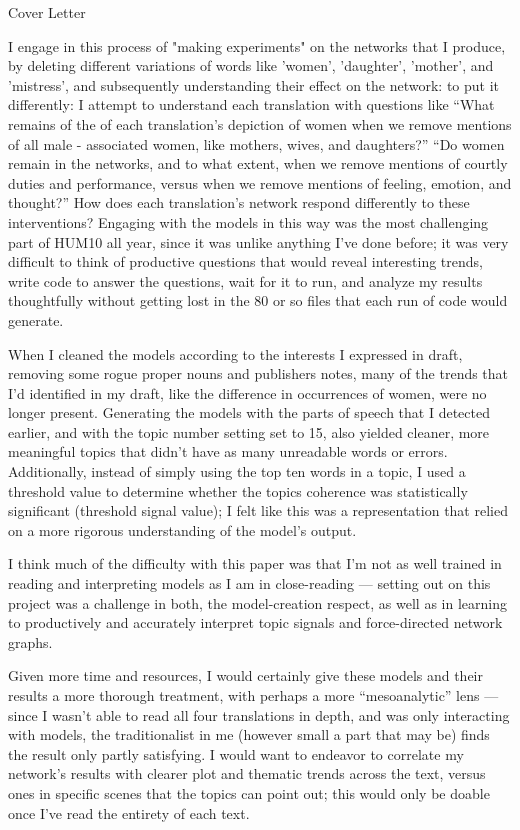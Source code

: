 \documentclass[12pt]{article}
\newenvironment{coverletter}{\begin{center} Cover Letter \end{center}}{\newpage }
\begin{document}
\begin{flushleft}
\begin{spacing}{2.0}
\begin{coverletter}
I engage in this process of "making experiments" on the networks that I produce, by deleting different variations of words like 'women', 'daughter', 'mother', and 'mistress', and subsequently understanding their effect on the network: to put it differently: I attempt to understand each translation with questions like ``What remains of the of each translation's depiction of women when we remove mentions of all male - associated women, like mothers, wives, and daughters?'' ``Do women remain in the networks, and to what extent, when we remove mentions of courtly duties and performance, versus when we remove mentions of feeling, emotion, and thought?'' How does each translation's network respond differently to these interventions? Engaging with the models in this way was the most challenging part of HUM10 all year, since it was unlike anything I've done before; it was very difficult to think of productive questions that would reveal interesting trends, write code to answer the questions, wait for it to run, and analyze my results thoughtfully without getting lost in the 80 or so files that each run of code would generate. \linebreak

When I cleaned the models according to the interests I expressed in draft, removing some rogue proper nouns and publishers notes, many of the trends that I'd identified in my draft, like the difference in occurrences of women, were no longer present. Generating the models with the parts of speech that I detected earlier, and with the topic number setting set to 15, also yielded cleaner, more meaningful topics that didn't have as many unreadable words or errors. Additionally, instead of simply using the top ten words in a topic, I used a threshold value to determine whether the topics coherence was statistically significant (threshold signal value); I felt like this was a representation that relied on a more rigorous understanding of the model's output.\linebreak

I think much of the difficulty with this paper was that I'm not as well trained in reading and interpreting models as I am in close-reading --- setting out on this project was a challenge in both, the model-creation respect, as well as in learning to productively and accurately interpret topic signals and force-directed network graphs. \linebreak

Given more time and resources, I would certainly give these models and their results a more thorough treatment, with perhaps a more ``mesoanalytic'' lens --- since I wasn't able to read all four translations in depth, and was only interacting with models, the traditionalist in me (however small a part that may be) finds the result only partly satisfying. I would want to endeavor to correlate my network's results with clearer plot and thematic trends across the text, versus ones in specific scenes that the topics can point out; this would only be doable once I've read the entirety of each text.


\end{coverletter}
\end{spacing}
\end{flushleft}
\end{document}
